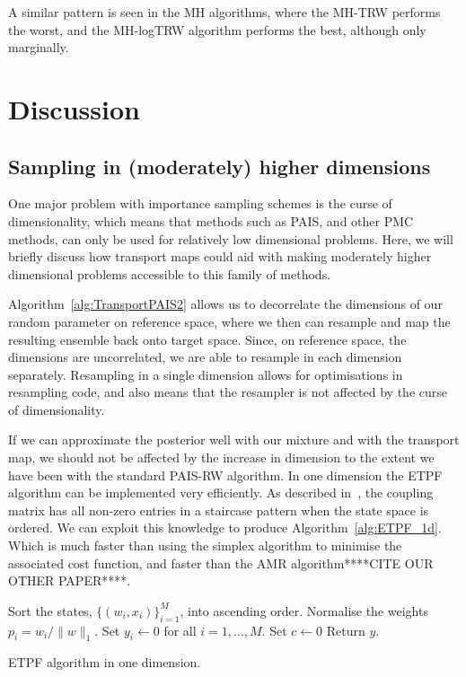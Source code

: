 \documentclass[final]{siamltex}
\begin{document}
A similar pattern is seen in the MH algorithms, where the MH-TRW performs the worst, and the MH-logTRW algorithm performs the best, although only marginally.

\section{Discussion}\label{sec:conc}

\subsection{Sampling in (moderately) higher
  dimensions}\label{sec:TPAIS_higher_dim}
One major problem with importance sampling schemes is the curse of
dimensionality, which means that methods such as PAIS, and other PMC
methods, can only be used for relatively low dimensional
problems. Here, we will briefly discuss how transport maps could aid
with making moderately higher dimensional problems accessible to this
family of methods.

Algorithm~\ref{alg:TransportPAIS2} allows us to decorrelate the dimensions of our random parameter on reference space, where we then can resample and map the resulting ensemble back onto target space. Since, on reference space, the dimensions are uncorrelated, we are able to resample in each dimension separately. Resampling in a single dimension allows for optimisations in resampling code, and also means that the resampler is not affected by the curse of dimensionality.

If we can approximate the posterior well with our mixture and with the
transport map, we should not be affected by the increase in dimension
to the extent we have been with the standard PAIS-RW algorithm. In one
dimension the ETPF algorithm can be implemented very efficiently. As
described in~\cite{reich2013nonparametric}, the coupling matrix has
all non-zero entries in a staircase pattern when the state space is
ordered. We can exploit this knowledge to produce
Algorithm~\ref{alg:ETPF_1d}. Which is much faster than using the
simplex algorithm to minimise the associated cost function, and faster
than the AMR algorithm****CITE OUR OTHER PAPER****.

\begin{table}[!htpb]
\begin{algorithm}[H]
\DontPrintSemicolon
\BlankLine
Sort the states, $\{(w_i, x_i)\}_{i=1}^M$, into ascending order.\;
Normalise the weights $p_i = w_i/\|w\|_1$.\;
Set $y_i \leftarrow 0$ for all $i=1,\dots,M$.\;
Set $c \leftarrow 0$\;
Return $y$.\;
\caption{ETPF algorithm in one dimension.\label{alg:ETPF_1d}}
\end{algorithm}
\end{table}




\end{document}
